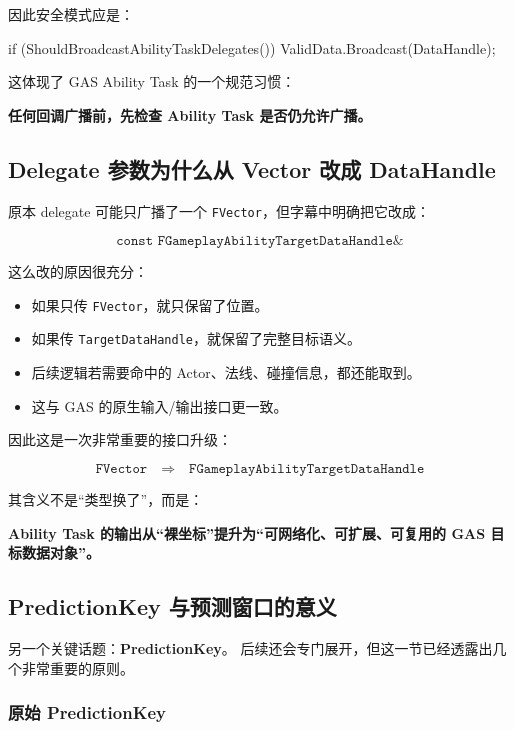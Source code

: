 \documentclass[10pt,CJKmath]{ctexart}
\begin{document}
因此安全模式应是：

\begin{code}
if (ShouldBroadcastAbilityTaskDelegates())
{
	ValidData.Broadcast(DataHandle);
}
\end{code}

这体现了 GAS Ability Task 的一个规范习惯：

\begin{center}
	\textbf{任何回调广播前，先检查 Ability Task 是否仍允许广播。}
\end{center}

\subsection{Delegate 参数为什么从 Vector 改成 DataHandle}

原本 delegate 可能只广播了一个 \texttt{FVector}，但字幕中明确把它改成：

\[
\texttt{const FGameplayAbilityTargetDataHandle\&}
\]

这么改的原因很充分：

\begin{itemize}
	\item 如果只传 \texttt{FVector}，就只保留了位置。
	\item 如果传 \texttt{TargetDataHandle}，就保留了完整目标语义。
	\item 后续逻辑若需要命中的 Actor、法线、碰撞信息，都还能取到。
	\item 这与 GAS 的原生输入/输出接口更一致。
\end{itemize}

因此这是一次非常重要的接口升级：

\[
\texttt{FVector} \quad \Longrightarrow \quad \texttt{FGameplayAbilityTargetDataHandle}
\]

其含义不是“类型换了”，而是：

\begin{center}
	\textbf{Ability Task 的输出从“裸坐标”提升为“可网络化、可扩展、可复用的 GAS 目标数据对象”。}
\end{center}

\subsection{PredictionKey 与预测窗口的意义}

另一个关键话题：\textbf{PredictionKey}。
后续还会专门展开，但这一节已经透露出几个非常重要的原则。

\subsubsection{原始 PredictionKey}
\end{document}
